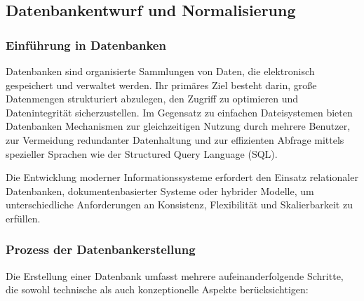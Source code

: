 \subsection{Datenbankentwurf und Normalisierung}

\subsubsection{Einführung in Datenbanken}

Datenbanken sind organisierte Sammlungen von Daten, die elektronisch gespeichert und verwaltet werden.
Ihr primäres Ziel besteht darin, große Datenmengen strukturiert abzulegen, den Zugriff zu optimieren und Datenintegrität sicherzustellen.
Im Gegensatz zu einfachen Dateisystemen bieten Datenbanken Mechanismen zur gleichzeitigen Nutzung durch mehrere Benutzer,
zur Vermeidung redundanter Datenhaltung und zur effizienten Abfrage mittels spezieller Sprachen wie der Structured Query Language (SQL).

Die Entwicklung moderner Informationssysteme erfordert den Einsatz relationaler Datenbanken, dokumentenbasierter Systeme
oder hybrider Modelle, um unterschiedliche Anforderungen an Konsistenz, Flexibilität und Skalierbarkeit zu erfüllen.

\subsubsection{Prozess der Datenbankerstellung}

Die Erstellung einer Datenbank umfasst mehrere aufeinanderfolgende Schritte, die sowohl technische als auch konzeptionelle Aspekte berücksichtigen:



